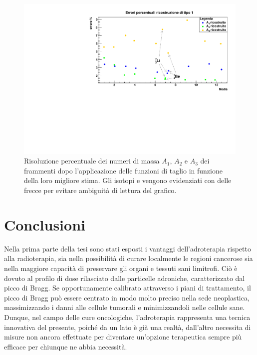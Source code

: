 \documentclass[12pt,a4paper,twoside]{report}
\begin{document}
	\begin{figure}[H]
		\centering
		\includegraphics[width=.97\linewidth]{c_multigr_final.pdf}
		\caption{Risoluzione percentuale dei numeri di massa $A_1$, $A_2$ e $A_3$ dei frammenti dopo l'applicazione delle funzioni di taglio in funzione della loro migliore stima. Gli isotopi  e  vengono evidenziati con delle frecce per evitare ambiguità di lettura del grafico.}
		\label{fig:number_mass_resolution}
	\end{figure}
	
	\chapter*{Conclusioni}
	Nella prima parte della tesi sono stati esposti i vantaggi dell'adroterapia rispetto alla radioterapia, sia nella possibilità di curare localmente le regioni cancerose sia nella maggiore capacità di preservare gli organi e tessuti sani limitrofi. Ciò è dovuto al profilo di dose rilasciato dalle particelle adroniche, caratterizzato dal picco di Bragg. Se opportunamente calibrato attraverso i piani di trattamento, il picco di Bragg può essere centrato in modo molto preciso nella sede neoplastica, massimizzando i danni alle cellule tumorali e minimizzandoli nelle cellule sane. Dunque, nel campo delle cure oncologiche, l'adroterapia rappresenta una tecnica innovativa del presente, poiché da un lato è già una realtà, dall'altro necessita di misure non ancora effettuate per diventare un'opzione terapeutica sempre più efficace per chiunque ne abbia necessità.
		
\end{document}
